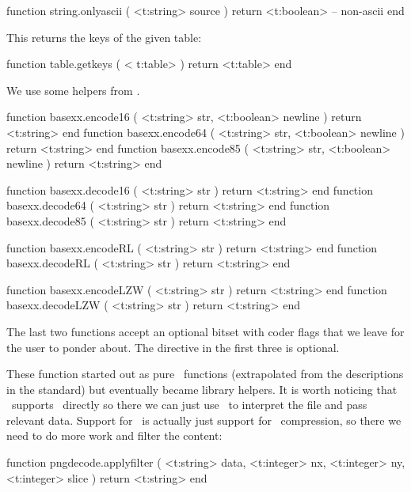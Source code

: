 \starttyping[option=LUA]
function string.onlyascii (
    <t:string> source
)
    return <t:boolean> -- non-ascii
end
\stoptyping

\stopsubsection

\startsubsection[title=Extra table helpers]

This returns the keys of the given table:

\starttyping[option=LUA]
function table.getkeys ( < t:table> )
    return <t:table>
end
\stoptyping

\stopsubsection

\startsubsection[title=Byte encoding and decoding]

We use some helpers from .

\starttyping[option=LUA]
function basexx.encode16  ( <t:string> str, <t:boolean> newline )
    return <t:string>
end
function basexx.encode64  ( <t:string> str, <t:boolean> newline )
    return <t:string>
end
function basexx.encode85  ( <t:string> str, <t:boolean> newline )
    return <t:string>
end

function basexx.decode16  ( <t:string> str ) return <t:string> end
function basexx.decode64  ( <t:string> str ) return <t:string> end
function basexx.decode85  ( <t:string> str ) return <t:string> end

function basexx.encodeRL  ( <t:string> str ) return <t:string> end
function basexx.decodeRL  ( <t:string> str ) return <t:string> end

function basexx.encodeLZW ( <t:string> str ) return <t:string> end
function basexx.decodeLZW ( <t:string> str ) return <t:string> end
\stoptyping

The last two functions accept an optional bitset with coder flags that we leave
for the user to ponder about. The  directive in the first three is
optional.

\stopsubsection

\startsubsection[title=\PNG\ decoding]

These function started out as pure \LUA\ functions (extrapolated from the
descriptions in the standard) but eventually became library helpers. It is
worth noticing that \PDF\ supports \JPEG\ directly so there we can just use
\LUA\ to interpret the file and pass relevant data. Support for \PNG\ is
actually just support for \PNG\ compression, so there we need to do more
work and filter the content:

\starttyping[option=LUA]
function pngdecode.applyfilter (
    <t:string>  data,
    <t:integer> nx,
    <t:integer> ny,
    <t:integer> slice
)
    return <t:string>
end
\stoptyping

